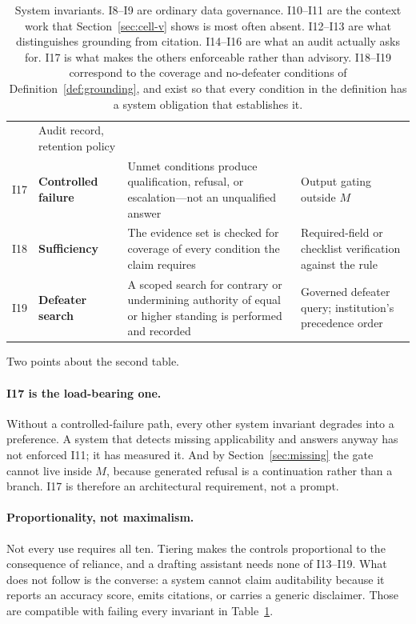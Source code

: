 \begin{table}[ht]
\begin{tabular}{@{}>{\raggedright\arraybackslash}p{0.7cm}>{\raggedright\arraybackslash}p{3.3cm}>{\raggedright\arraybackslash}p{4.6cm}>{\raggedright\arraybackslash}p{4.4cm}@{}}
       & Audit record, retention policy \\
    \addlinespace
    I17 & \textbf{Controlled failure}
       & Unmet conditions produce qualification, refusal, or escalation---not an
         unqualified answer
       & Output gating outside $M$ \\
    \addlinespace
    I18 & \textbf{Sufficiency}
       & The evidence set is checked for coverage of every condition the claim requires
       & Required-field or checklist verification against the rule \\
    \addlinespace
    I19 & \textbf{Defeater search}
       & A scoped search for contrary or undermining authority of equal or higher
         standing is performed and recorded
       & Governed defeater query; institution's precedence order \\
    \bottomrule
  \end{tabular}
  \caption{System invariants. I8--I9 are ordinary data governance. I10--I11 are the
    context work that Section~\ref{sec:cell-v} shows is most often absent.
    I12--I13 are what distinguishes grounding from citation. I14--I16 are what an
    audit actually asks for. I17 is what makes the others enforceable rather than
    advisory. I18--I19 correspond to the coverage and no-defeater conditions of
    Definition~\ref{def:grounding}, and exist so that every condition in the definition
    has a system obligation that establishes it.}
  \label{tab:invariants-system}
\end{table}

Two points about the second table.

\paragraph{I17 is the load-bearing one.} Without a controlled-failure path, every
other system invariant degrades into a preference. A system that detects missing
applicability and answers anyway has not enforced I11; it has measured it. And by
Section~\ref{sec:missing} the gate cannot live inside $M$, because generated
refusal is a continuation rather than a branch. I17 is therefore an architectural
requirement, not a prompt.

\paragraph{Proportionality, not maximalism.} Not every use requires all ten.
Tiering makes the controls proportional to the consequence of
reliance, and a drafting assistant needs none of I13--I19. What does not follow is
the converse: a system cannot claim auditability because it reports an accuracy
score, emits citations, or carries a generic disclaimer. Those are compatible with
failing every invariant in Table~\ref{tab:invariants-system}.

